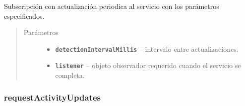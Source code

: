 \begin{fulllineitems}
    \label{org/hardroid/api/ActivityRecognitionApi:org.hardroid.api.ActivityRecognitionApi.requestActivityUpdates(long, ActivityRecognitionListener)}\par
Subscripción con actualización periodica al servicio con los parámetros especificados.
\begin{quote}\begin{description}
\item[{Parámetros}] \leavevmode\begin{itemize}
\item {} 
\textbf{\texttt{detectionIntervalMillis}} -- intervalo entre actualizaciones. 

\item {} 
\textbf{\texttt{listener}} -- objeto observador requerido cuando el servicio se completa.

\end{itemize}

\end{description}\end{quote}

\end{fulllineitems}



\subsubsection{requestActivityUpdates}
\label{org/hardroid/api/ActivityRecognitionApi:id3}


